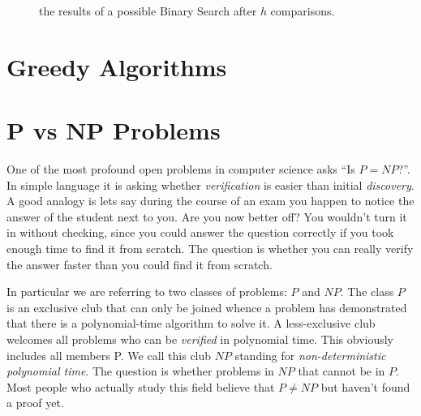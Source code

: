 			\begin{figure}[t]
				\centering
				\caption{\label{fig:simpleBinaryTree} the results of a possible Binary Search after $h$ comparisons. }
			\end{figure}
	\section{Greedy Algorithms}
	
	\section{P vs NP Problems}
		One of the most profound open problems in computer science asks \enquote{Is $P = NP$?}. In simple language it is asking whether \textit{verification} is easier than initial \textit{discovery}. A good analogy is lets say during the course of an exam you happen to notice the answer of the student next to you. Are you now better off? You wouldn't turn it in without checking, since you could answer the question correctly if you took enough time to find it from scratch. The question is whether you can really verify the answer faster than you could find it from scratch. 
		
		In particular we are referring to two classes of problems: $P$ and $NP$. The class $P$ is an exclusive club that can only be joined whence a problem has demonstrated that there is a polynomial-time algorithm to solve it. A less-exclusive club welcomes all problems who can be \textit{verified} in polynomial time. This obviously includes all members P. We call this club $NP$ standing for \textit{non-deterministic polynomial time}. The question is whether problems in $NP$ that cannot be in $P$. Most people who actually study this field believe that $P \ne NP$ but haven't found a proof yet.
	

